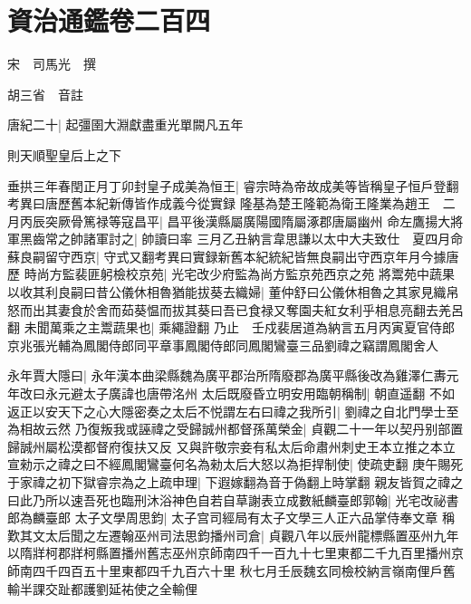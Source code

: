 \chapter{資治通鑑卷二百四}
宋　司馬光　撰

胡三省　音註

唐紀二十|{
	起彊圉大淵獻盡重光單闕凡五年}


則天順聖皇后上之下

垂拱三年春閏正月丁卯封皇子成美為恒王|{
	睿宗時為帝故成美等皆稱皇子恒戶登翻　考異曰唐歷舊本紀新傳皆作成義今從實録}
隆基為楚王隆範為衛王隆業為趙王　二月丙辰突厥骨篤禄等寇昌平|{
	昌平後漢縣屬廣陽國隋屬涿郡唐屬幽州}
命左鷹揚大將軍黑齒常之帥諸軍討之|{
	帥讀曰率}
三月乙丑納言韋思謙以太中大夫致仕　夏四月命蘇良嗣留守西京|{
	守式又翻考異曰實録新舊本紀統紀皆無良嗣出守西京年月今據唐歷}
時尚方監裴匪躬檢校京苑|{
	光宅改少府監為尚方監京苑西京之苑}
將鬻苑中蔬果以收其利良嗣曰昔公儀休相魯猶能拔葵去織婦|{
	董仲舒曰公儀休相魯之其家見織帛怒而出其妻食於舍而茹葵愠而拔其葵曰吾已食禄又奪園夫紅女利乎相息亮翻去羌呂翻}
未聞萬乘之主鬻蔬果也|{
	乘繩證翻}
乃止　壬戍裴居道為納言五月丙寅夏官侍郎京兆張光輔為鳳閣侍郎同平章事鳳閣侍郎同鳳閣鸞臺三品劉禕之竊謂鳳閣舍人

永年賈大隱曰|{
	永年漢本曲梁縣魏為廣平郡治所隋廢郡為廣平縣後改為雞澤仁夀元年改曰永元避太子廣諱也唐帶洺州}
太后既廢昏立明安用臨朝稱制|{
	朝直遥翻}
不如返正以安天下之心大隱密奏之太后不悦謂左右曰禕之我所引|{
	劉禕之自北門學士至為相故云然}
乃復叛我或誣禕之受歸誠州都督孫萬榮金|{
	貞觀二十一年以契丹别部置歸誠州屬松漠都督府復扶又反}
又與許敬宗妾有私太后命肅州刺史王本立推之本立宣勑示之禕之曰不經鳳閣鸞臺何名為勑太后大怒以為拒捍制使|{
	使疏吏翻}
庚午賜死于家禕之初下獄睿宗為之上疏申理|{
	下遐嫁翻為音于偽翻上時掌翻}
親友皆賀之禕之曰此乃所以速吾死也臨刑沐浴神色自若自草謝表立成數紙麟臺郎郭翰|{
	光宅改祕書郎為麟臺郎}
太子文學周思鈞|{
	太子宫司經局有太子文學三人正六品掌侍奉文章}
稱歎其文太后聞之左遷翰巫州司法思鈞播州司倉|{
	貞觀八年以辰州龍標縣置巫州九年以隋牂柯郡牂柯縣置播州舊志巫州京師南四千一百九十七里東都二千九百里播州京師南四千四百五十里東都四千九百六十里}
秋七月壬辰魏玄同檢校納言嶺南俚戶舊輸半課交趾都護劉延祐使之全輸俚

